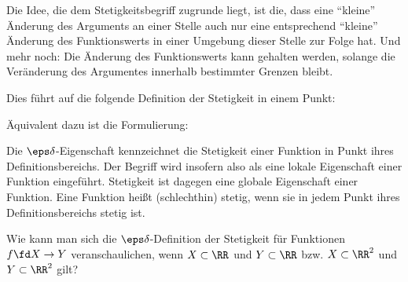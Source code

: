 \begin{antwort}
  Die Idee, die dem Stetigkeitsbegriff zugrunde liegt, ist die,
  dass eine "`kleine"' Änderung des Arguments an einer Stelle  
  auch nur eine entsprechend "`kleine"' Änderung des Funktionswerts 
  in einer Umgebung dieser Stelle zur Folge hat. 
  Und mehr noch: Die Änderung des Funktionswerts 
  kann  gehalten werden, solange die Veränderung 
  des Argumentes innerhalb bestimmter Grenzen bleibt.    
  
  Dies führt auf die folgende Definition der Stetigkeit in einem Punkt:

  \medskip
  \noindent{}
  \medskip
  Äquivalent dazu ist die Formulierung:

  \medskip
  \noindent{}
  \noindent
  Die $\eps\delta$-Eigenschaft kennzeichnet die Stetigkeit 
  einer Funktion in  Punkt ihres Definitionsbereichs. 
  Der Begriff wird insofern also als eine lokale Eigenschaft 
  einer Funktion eingeführt. Stetigkeit  ist dagegen eine 
  globale Eigenschaft einer Funktion. Eine Funktion heißt (schlechthin) stetig, 
  wenn sie in jedem Punkt ihres Definitionsbereichs stetig ist. 
  \AntEnd
\end{antwort}

\begin{frage}\label{03_svis}
  Wie kann man sich die $\eps\delta$-Definition der Stetigkeit 
  für Funktionen $f\fd X\to Y$ veranschaulichen, wenn 
  $X\subset \RR$ und $Y\subset \RR$ bzw. $X\subset \RR^2$ und $Y\subset \RR^2$ gilt?
\end{frage}

